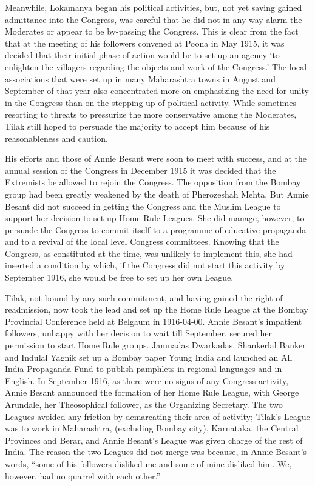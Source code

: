 \begin{multicols}{2}
Meanwhile, Lokamanya began his political activities, but, not yet saving gained admittance into the Congress, was careful that he did not in any way alarm the Moderates or appear to be by-passing the Congress. This is clear from the fact that at the meeting of his followers convened at Poona in May 1915, it was decided that their initial phase of action would be to set up an agency `to enlighten the villagers regarding the objects and work of the Congress.' The local associations that were set up in many Maharashtra towns in August and September of that year also concentrated more on emphasizing the need for unity in the Congress than on the stepping up of political activity. While sometimes resorting to threats to pressurize the more conservative among the Moderates, Tilak still hoped to persuade the majority to accept him because of his reasonableness and caution.

His efforts and those of Annie Besant were soon to meet with success, and at the annual session of the Congress in December 1915 it was decided that the Extremists be allowed to rejoin the Congress. The opposition from the Bombay group had been greatly weakened by the death of Pherozeshah Mehta. But Annie Besant did not succeed in getting the Congress and the Muslim League to support her decision to set up Home Rule Leagues. She did manage, however, to persuade the Congress to commit itself to a programme of educative propaganda and to a revival of the local level Congress committees. Knowing that the Congress, as constituted at the time, was unlikely to implement this, she had inserted a condition by which, if the Congress did not start this activity by September 1916, she would be free to set up her own League.

Tilak, not bound by any such commitment, and having gained the right of readmission, now took the lead and set up the Home Rule League at the Bombay Provincial Conference held at Belgaum in 1916-04-00. Annie Besant's impatient followers, unhappy with her decision to wait till September, secured her permission to start Home Rule groups. Jamnadas Dwarkadas, Shankerlal Banker and Indulal Yagnik set up a Bombay paper Young India and launched an All India Propaganda Fund to publish pamphlets in regional languages and in English. In September 1916, as there were no signs of any Congress activity, Annie Besant announced the formation of her Home Rule League, with George Arundale, her Theosophical follower, as the Organizing Secretary. The two Leagues avoided any friction by demarcating their area of activity; Tilak's League was to work in Maharashtra, (excluding Bombay city), Karnataka, the Central Provinces and Berar, and Annie Besant's League was given charge of the rest of India. The reason the two Leagues did not merge was because, in Annie Besant's words, ``some of his followers disliked me and some of mine disliked him. We, however, had no quarrel with each other.''


\end{multicols}
